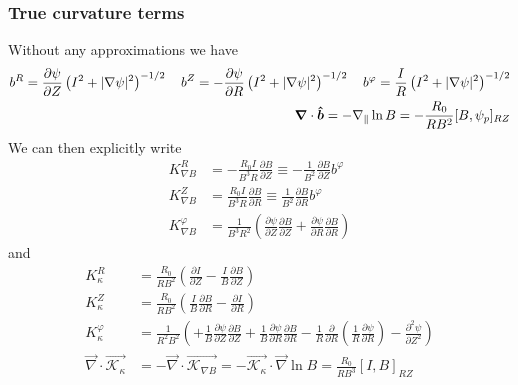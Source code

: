 \subsubsection{True curvature terms}
Without any approximations we have
\begin{align}
b^R = {\frac{\partial \psi}{\partial Z}}\left(I^2+|\nabla\psi|^2\right)^{-1/2} \quad
b^Z = -{\frac{\partial \psi}{\partial R}}\left(I^2+|\nabla\psi|^2\right)^{-1/2} \quad 
b^\varphi = \frac{I}{R}\left(I^2+|\nabla\psi|^2\right)^{-1/2} \\
{\boldsymbol{\nabla}}\cdot\bm{\hat{b}} = -\nabla_\parallel \ln B = -\frac{R_0}{R B^2}[B,\psi_p]_{RZ}
\label{}
\end{align}
We can then explicitly write
\begin{align}
K_{\nabla B}^R &= -\frac{R_0 I}{B^3R}\frac{\partial B}{\partial Z} \equiv -\frac{1}{B^2}\frac{\partial B}{\partial Z}b^\varphi \\
K_{\nabla B}^Z &= \frac{R_0 I}{B^3R}\frac{\partial B}{\partial R}\equiv \frac{1}{B^2}\frac{\partial B}{\partial R}b^\varphi \\
K_{\nabla B}^\varphi &= \frac{1}{B^3R^2}\left(\frac{\partial\psi}{\partial Z} \frac{\partial B}{\partial Z} + \frac{\partial \psi}{\partial R}\frac{\partial B}{\partial R}\right)
\label{}
\end{align}
and
\begin{align}
K_\kappa^R &= \frac{R_0 }{RB^2}\left( \frac{\partial I}{\partial Z} -\frac{I}{B}\frac{\partial B}{\partial Z}\right) \\
K_\kappa^Z &= \frac{R_0 }{RB^2} \left( \frac{I}{B}\frac{\partial B}{\partial R} - \frac{\partial I}{\partial R} \right)\\
K_\kappa^\varphi &= \frac{1}{R^2B^2}\left(
+ \frac{1}{B}\frac{\partial\psi}{\partial Z} \frac{\partial B}{\partial Z}
+ \frac{1}{B}\frac{\partial \psi}{\partial R}\frac{\partial B}{\partial R}
-\frac{1}{R}\frac{\partial}{\partial R}\left(\frac{1}{R}\frac{\partial\psi}{\partial R}\right) 
- \frac{\partial^2 \psi}{\partial Z^2}
\right) \\
\vec\nabla\cdot\vec{\mathcal K_\kappa} &= -\vec\nabla\cdot\vec{\mathcal K_{\nabla B}}= -\vec{\mathcal K_\kappa}\cdot \vec \nabla\ln B = \frac{R_0}{RB^3}[I,B]_{RZ}
\label{}
\end{align}

